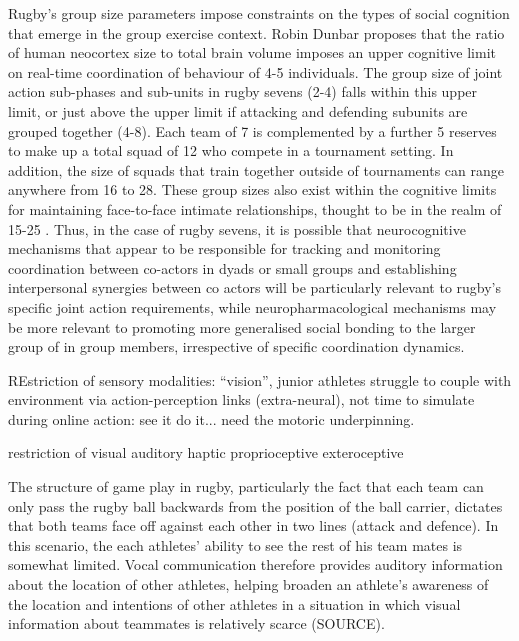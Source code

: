 \begin{CJK}{UTF8}{gbsn}
Rugby's group size parameters impose constraints on the types of social cognition that emerge in the group exercise context.  Robin Dunbar \textcite{Dunbar1992} proposes that the ratio of human neocortex size to total brain volume imposes an upper cognitive limit on real-time coordination of behaviour of 4-5 individuals.  The group size of joint action sub-phases and sub-units in rugby sevens (2-4) falls within this upper limit, or just above the upper limit if attacking and defending subunits are grouped together (4-8). Each team of 7 is complemented by a further 5 reserves to make up a total squad of 12 who compete in a tournament setting.  In addition, the size of squads that train together outside of tournaments can range anywhere from 16 to 28.  These group sizes also exist within the cognitive limits for maintaining face-to-face intimate relationships, thought to be in the realm of 15-25 \citep{Dunbar1992,Dunbar2010}. Thus, in the case of rugby sevens, it is possible that neurocognitive mechanisms that appear to be responsible for tracking and monitoring coordination between co-actors in dyads or small groups and establishing interpersonal synergies between co actors will be particularly relevant
to rugby's specific joint action requirements, while neuropharmacological mechanisms may be more relevant to promoting more generalised social bonding to the larger group of in group members, irrespective of specific coordination dynamics.


REstriction of sensory modalities: ``vision'', junior athletes struggle to couple with environment via action-perception links (extra-neural), not time to simulate during online action: see it do it... need the motoric underpinning.  





restriction of visual
auditory
haptic
proprioceptive
exteroceptive

The structure of game play in rugby, particularly the fact that each team can only pass the rugby ball backwards from the position of the ball carrier, dictates that both teams face off against each other in two lines (attack and defence).  In this scenario, the each athletes' ability to see the rest of his team mates is somewhat limited.  Vocal communication therefore provides auditory information about the location of other athletes, helping broaden an athlete's awareness of the location and intentions of other athletes in a situation in which visual information about teammates is relatively scarce (SOURCE).


\end{CJK}
